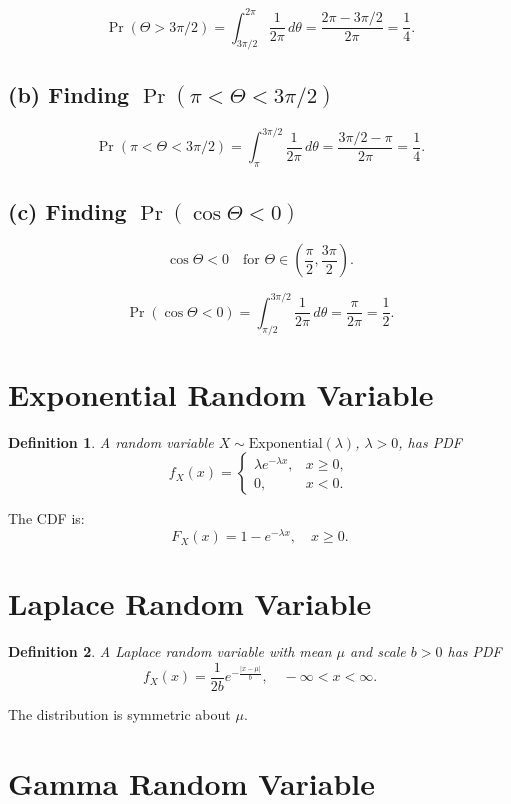 \documentclass[11pt]{article}
\newtheorem{definition}{Definition}
\begin{document}
\[
\Pr(\Theta > 3\pi/2)
= \int_{3\pi/2}^{2\pi} \frac{1}{2\pi}\, d\theta
= \frac{2\pi - 3\pi/2}{2\pi}
= \frac{1}{4}.
\]

\subsection*{(b) Finding $\Pr(\pi < \Theta < 3\pi/2)$}

\[
\Pr(\pi < \Theta < 3\pi/2)
= \int_{\pi}^{3\pi/2} \frac{1}{2\pi}\, d\theta
= \frac{3\pi/2 - \pi}{2\pi}
= \frac{1}{4}.
\]

\subsection*{(c) Finding $\Pr(\cos \Theta < 0)$}

\[
\cos \Theta < 0 \quad \text{for } \Theta \in \left(\frac{\pi}{2}, \frac{3\pi}{2}\right).
\]

\[
\Pr(\cos \Theta < 0)
= \int_{\pi/2}^{3\pi/2} \frac{1}{2\pi}\, d\theta
= \frac{\pi}{2\pi}
= \frac{1}{2}.
\]

\section{Exponential Random Variable}

\begin{definition}
A random variable $X \sim \text{Exponential}(\lambda)$, $\lambda > 0$, has PDF
\[
f_X(x) =
\begin{cases}
\lambda e^{-\lambda x}, & x \ge 0,\\
0, & x < 0.
\end{cases}
\]
\end{definition}

The CDF is:
\[
F_X(x) = 1 - e^{-\lambda x}, \quad x \ge 0.
\]

\section{Laplace Random Variable}

\begin{definition}
A Laplace random variable with mean $\mu$ and scale $b>0$ has PDF
\[
f_X(x) = \frac{1}{2b} e^{-\frac{|x-\mu|}{b}}, \quad -\infty < x < \infty.
\]
\end{definition}

The distribution is symmetric about $\mu$.

\section{Gamma Random Variable}
\end{document}
